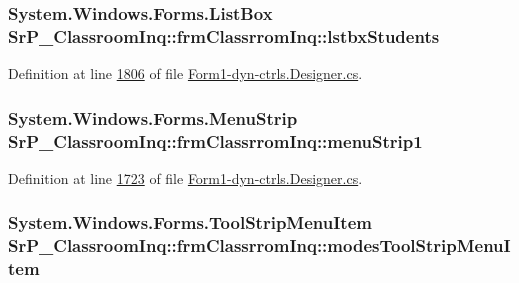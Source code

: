 \hypertarget{class_sr_p___classroom_inq_1_1frm_classrrom_inq_a0c67f5e900e579981b753ac9853a5141}{
\subsubsection[{lstbx\-Students}]{\setlength{\rightskip}{0pt plus 5cm}\-System.\-Windows.\-Forms.\-List\-Box {\bf \-Sr\-P\-\_\-\-Classroom\-Inq\-::frm\-Classrrom\-Inq\-::lstbx\-Students}}}
\label{class_sr_p___classroom_inq_1_1frm_classrrom_inq_a0c67f5e900e579981b753ac9853a5141}


\-Definition at line \hyperlink{_form1-dyn-ctrls_8_designer_8cs_source_l01806}{1806} of file \hyperlink{_form1-dyn-ctrls_8_designer_8cs_source}{\-Form1-\/dyn-\/ctrls.\-Designer.\-cs}.

\hypertarget{class_sr_p___classroom_inq_1_1frm_classrrom_inq_a549704b03b13cfbb5cbc07c18c0c600a}{
\subsubsection[{menu\-Strip1}]{\setlength{\rightskip}{0pt plus 5cm}\-System.\-Windows.\-Forms.\-Menu\-Strip {\bf \-Sr\-P\-\_\-\-Classroom\-Inq\-::frm\-Classrrom\-Inq\-::menu\-Strip1}}}
\label{class_sr_p___classroom_inq_1_1frm_classrrom_inq_a549704b03b13cfbb5cbc07c18c0c600a}


\-Definition at line \hyperlink{_form1-dyn-ctrls_8_designer_8cs_source_l01723}{1723} of file \hyperlink{_form1-dyn-ctrls_8_designer_8cs_source}{\-Form1-\/dyn-\/ctrls.\-Designer.\-cs}.

\hypertarget{class_sr_p___classroom_inq_1_1frm_classrrom_inq_a8eef2c0ef527338feb8e51e6ddef9cc1}{
\subsubsection[{modes\-Tool\-Strip\-Menu\-Item}]{\setlength{\rightskip}{0pt plus 5cm}\-System.\-Windows.\-Forms.\-Tool\-Strip\-Menu\-Item {\bf \-Sr\-P\-\_\-\-Classroom\-Inq\-::frm\-Classrrom\-Inq\-::modes\-Tool\-Strip\-Menu\-Item}}}
\label{class_sr_p___classroom_inq_1_1frm_classrrom_inq_a8eef2c0ef527338feb8e51e6ddef9cc1}


